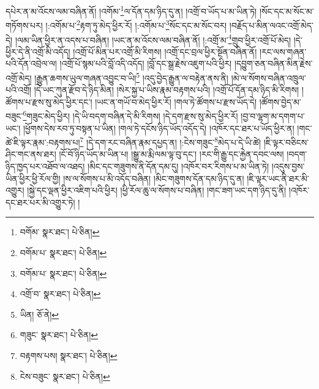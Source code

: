 དཔེར་ན་མ་འོངས་ལམ་བཞིན་ནོ། །འགོམ་\footnote{བགོམ་  སྣར་ཐང་།  པེ་ཅིན། }ལ་དོན་དམ་ཉིད་དུ་ན། །འགྲོ་བ་ཡོད་པ་མ་ཡིན་ཏེ། །སོང་དང་མ་སོང་མ་གཏོགས་པར། །:འགོམ་པ་\footnote{བགོམ་པ་  སྣར་ཐང་།  པེ་ཅིན། }རྟག་ཏུ་མེད་ཕྱིར་རོ། །:འགོམ་པ་\footnote{བགོམ་པ་  སྣར་ཐང་།  པེ་ཅིན། }སོང་དང་མ་སོང་བར། །བརྗོད་པ་མིན་ལའང་འགྲོ་མེད་དེ། །ལམ་ཡིན་ཕྱིར་ན་འདས་པ་བཞིན། །ཡང་ན་མ་འོངས་ལམ་བཞིན་ནོ། །:འགྲོ་མ་\footnote{འགྲོ་བ་  སྣར་ཐང་།  པེ་ཅིན། }གྲུབ་ཕྱིར་འགྲོ་པོ་མེད། །དེ་ཕྱིར་དེ་ནི་འགྲོ་མི་འདོད། །འགྲོ་པོ་མིན་པར་འགྲོ་མི་རིགས། །འགྲོ་དང་བྲལ་ཕྱིར་སྔོན་བཞིན་ནོ། །རང་ལས་གཞན་པའི་དོན་འབྲེལ་ལ། །འགྲོ་པོ་སྙམ་པའི་བློ་འདི་འདོད། །བློ་དང་སྒྲ་རྗེས་འཇུག་པའི་ཕྱིར། །དབྱུག་ཅན་བཞིན་མིན་རྗེས་འགྲོ་མེད། །རྒྱུན་ཆགས་ཡུལ་གཞན་འབྱུང་བ་ཡི།\footnote{ཡིན།  ཅོ་ནེ། } །འདུ་བྱེད་རྒྱུན་ལ་བརྟེན་ནས་ནི། །མེ་ལ་སོགས་བཞིན་འཁྲུལ་པའི་འགྲོ། །དེ་ཡང་ཀུན་རྫོབ་དེ་ཉིད་མིན། །སེར་སྐྱ་པ་ཡིས་རྣམ་བརྟགས་པའི། །འགྲོ་པོ་དོན་དམ་ཉིད་མི་རིགས། །ཚོགས་པ་རྫས་སུ་མེད་ཕྱིར་དང་། །ཡང་ན་གཡོ་བ་མེད་ཕྱིར་རོ། །གལ་ཏེ་ཚོགས་པ་རྫས་ཡོད་དེ། །ཚོགས་བྱེད་མ་བཟུང་\footnote{གཟུང་  སྣར་ཐང་།  པེ་ཅིན། }གཟུང་མེད་ཕྱིར། །དེ་ཡི་བདག་བཞིན་དེ་མི་རིགས། །དེ་དག་རྫས་སུ་མེད་ཕྱིར་རོ། །བྱ་བ་ལྷག་མ་དགག་པ་ཡང་། །ཕྱོགས་དེས་རབ་ཏུ་བསྟན་པ་ཡིན། །གལ་ཏེ་དངོས་ཉིད་ཡོད་འདོད་དེ། །འཁོར་དང་ཐར་པ་ཡོད་ཕྱིར་ན། །གང་ཚེ་ཇི་ལྟར་རྣམ་:བརྟགས་པ།\footnote{བརྟགས་པས།  སྣར་ཐང་།  པེ་ཅིན། } །དེ་དག་རང་བཞིན་རྣམ་དཔྱད་ན། །:ངེས་གཟུང་\footnote{ངེས་བཟུང་  སྣར་ཐང་།  པེ་ཅིན། }མེད་པ་དེ་ཡི་ཚེ། །ཇི་ལྟར་བཅིངས་ཤིང་གང་ནས་ཐར། །ངོ་བོ་ཉིད་ཡོད་མ་ཡིན་པ། །སྒྱུ་མ་རྨི་ལམ་ལྟ་བུ་དང་། །རང་གི་རྒྱུ་དང་རྐྱེན་དབང་ལས། །བདག་ཉིད་ཁྱད་པར་འཐོབ་ལ་འཐད། །མིང་དང་གཟུགས་ནི་དོན་དམ་དུ། །འཁོར་བར་རིགས་པ་མ་ཡིན་ཏེ། །འདུས་བྱས་ཡིན་ཕྱིར་ཕྱི་རོལ་གྱི། །ས་ལ་སོགས་པ་མི་འདོད་བཞིན། །མིང་གཟུགས་དོན་དམ་ཉིད་དུ་ན། །ཇི་ལྟར་ཡང་ནི་ཐར་མི་འགྱུར། །སྐྱེ་དང་ལྡན་ཕྱིར་འཇིག་པའི་ཕྱིར། །ཕྱི་རོལ་ཆུ་ལ་སོགས་པ་བཞིན། །གང་ཟག་ཡང་དག་ཉིད་དུ་ནི། །འཁོར་དང་ཐར་པར་མི་འགྱུར་ཏེ། །

